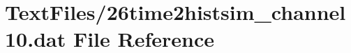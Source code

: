 \hypertarget{26time2histsim__channel10_8dat}{}\section{Text\+Files/26time2histsim\+\_\+channel10.dat File Reference}
\label{26time2histsim__channel10_8dat}
